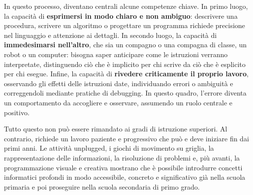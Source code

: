 In questo processo, diventano centrali alcune competenze chiave. In primo luogo, la capacità di \textbf{esprimersi in modo chiaro e non ambiguo}: descrivere una procedura, scrivere un algoritmo o progettare un programma richiede precisione nel linguaggio e attenzione ai dettagli. In secondo luogo, la capacità di \textbf{immedesimarsi nell'altro}, che sia un compagno o una compagna di classe, un robot o un computer: bisogna saper anticipare come le istruzioni verranno interpretate, distinguendo ciò che è implicito per chi scrive da ciò che è esplicito per chi esegue. Infine, la capacità di \textbf{rivedere criticamente il proprio lavoro}, osservando gli effetti delle istruzioni date, individuando errori o ambiguità e correggendoli mediante pratiche di debugging. In questo quadro, l'errore diventa un comportamento da accogliere e osservare, assumendo un ruolo centrale e positivo.

Tutto questo non può essere rimandato ai gradi di istruzione superiori. Al contrario, richiede un lavoro paziente e progressivo che può e deve iniziare fin dai primi anni. Le attività unplugged, i giochi di movimento su griglia, la rappresentazione delle informazioni, la risoluzione di problemi e, più avanti, la programmazione visuale e creativa mostrano che è possibile introdurre concetti informatici profondi in modo accessibile, concreto e significativo già nella scuola primaria e poi proseguire nella scuola secondaria di primo grado.
